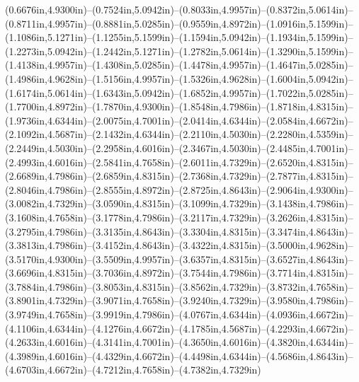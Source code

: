 (0.6676in,4.9300in)--(0.7524in,5.0942in)--(0.8033in,4.9957in)--(0.8372in,5.0614in)--(0.8711in,4.9957in)--(0.8881in,5.0285in)--(0.9559in,4.8972in)--(1.0916in,5.1599in)--(1.1086in,5.1271in)--(1.1255in,5.1599in)--(1.1594in,5.0942in)--(1.1934in,5.1599in)--(1.2273in,5.0942in)--(1.2442in,5.1271in)--(1.2782in,5.0614in)--(1.3290in,5.1599in)--(1.4138in,4.9957in)--(1.4308in,5.0285in)--(1.4478in,4.9957in)--(1.4647in,5.0285in)--(1.4986in,4.9628in)--(1.5156in,4.9957in)--(1.5326in,4.9628in)--(1.6004in,5.0942in)--(1.6174in,5.0614in)--(1.6343in,5.0942in)--(1.6852in,4.9957in)--(1.7022in,5.0285in)--(1.7700in,4.8972in)--(1.7870in,4.9300in)--(1.8548in,4.7986in)--(1.8718in,4.8315in)--(1.9736in,4.6344in)--(2.0075in,4.7001in)--(2.0414in,4.6344in)--(2.0584in,4.6672in)--(2.1092in,4.5687in)--(2.1432in,4.6344in)--(2.2110in,4.5030in)--(2.2280in,4.5359in)--(2.2449in,4.5030in)--(2.2958in,4.6016in)--(2.3467in,4.5030in)--(2.4485in,4.7001in)--(2.4993in,4.6016in)--(2.5841in,4.7658in)--(2.6011in,4.7329in)--(2.6520in,4.8315in)--(2.6689in,4.7986in)--(2.6859in,4.8315in)--(2.7368in,4.7329in)--(2.7877in,4.8315in)--(2.8046in,4.7986in)--(2.8555in,4.8972in)--(2.8725in,4.8643in)--(2.9064in,4.9300in)--(3.0082in,4.7329in)--(3.0590in,4.8315in)--(3.1099in,4.7329in)--(3.1438in,4.7986in)--(3.1608in,4.7658in)--(3.1778in,4.7986in)--(3.2117in,4.7329in)--(3.2626in,4.8315in)--(3.2795in,4.7986in)--(3.3135in,4.8643in)--(3.3304in,4.8315in)--(3.3474in,4.8643in)--(3.3813in,4.7986in)--(3.4152in,4.8643in)--(3.4322in,4.8315in)--(3.5000in,4.9628in)--(3.5170in,4.9300in)--(3.5509in,4.9957in)--(3.6357in,4.8315in)--(3.6527in,4.8643in)--(3.6696in,4.8315in)--(3.7036in,4.8972in)--(3.7544in,4.7986in)--(3.7714in,4.8315in)--(3.7884in,4.7986in)--(3.8053in,4.8315in)--(3.8562in,4.7329in)--(3.8732in,4.7658in)--(3.8901in,4.7329in)--(3.9071in,4.7658in)--(3.9240in,4.7329in)--(3.9580in,4.7986in)--(3.9749in,4.7658in)--(3.9919in,4.7986in)--(4.0767in,4.6344in)--(4.0936in,4.6672in)--(4.1106in,4.6344in)--(4.1276in,4.6672in)--(4.1785in,4.5687in)--(4.2293in,4.6672in)--(4.2633in,4.6016in)--(4.3141in,4.7001in)--(4.3650in,4.6016in)--(4.3820in,4.6344in)--(4.3989in,4.6016in)--(4.4329in,4.6672in)--(4.4498in,4.6344in)--(4.5686in,4.8643in)--(4.6703in,4.6672in)--(4.7212in,4.7658in)--(4.7382in,4.7329in)
